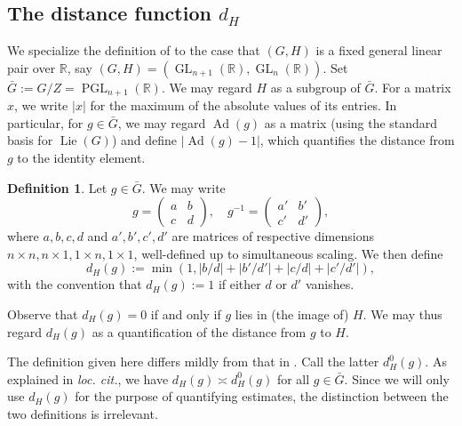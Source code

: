 \documentclass[reqno]{amsart}
\DeclareMathOperator{\GL}{GL}
\DeclareMathOperator{\Ad}{Ad}
\DeclareMathOperator{\PGL}{PGL}
\DeclareMathOperator{\Lie}{Lie}
\theoremstyle{plain} \newtheorem{theorem} {Theorem}
\theoremstyle{definition} \newtheorem{definition} [theorem] {Definition}
\theoremstyle{itplain} %
\numberwithin{equation}{section}
\numberwithin{theorem}{section}
\begin{document}
\subsection{The distance function $d_H$}\label{sec:dist-funct-d_h}
We specialize the definition of  \cite[\S4.2]{2020arXiv201202187N} to the case that $(G,H)$ is a fixed general linear pair over $\mathbb{R}$, say $(G,H) = (\GL_{n+1}(\mathbb{R}), \GL_n(\mathbb{R}))$.  Set $\bar{G} := G/Z = \PGL_{n+1}(\mathbb{R})$.  We may regard $H$ as a subgroup of $\bar{G}$.  For a matrix $x$, we write $|x|$ for the maximum of the absolute values of its entries.  In particular, for $g \in \bar{G}$, we may regard $\Ad(g)$ as a matrix (using the standard basis for $\Lie(G)$) and define $|\Ad(g) - 1|$, which quantifies the distance from $g$ to the identity element.

\begin{definition}
Let $g \in \bar{G}$.  We may write
\begin{equation*}
  g = \begin{pmatrix}
    a & b \\
    c & d
  \end{pmatrix},
  \quad
  g^{-1} =
  \begin{pmatrix}
    a' & b' \\
    c' & d'
  \end{pmatrix},
\end{equation*}
where $a,b,c,d$ and $a',b',c',d'$ are matrices of respective dimensions $n \times n, n \times 1, 1 \times n, 1 \times 1$, well-defined up to simultaneous scaling.  We then define 
\begin{equation*}
  d_H(g) := \min\left(1, |b/d| + |b'/d'| + |c/d| + |c'/d'|\right),
\end{equation*}
with the convention that $d_H(g) := 1$ if either $d$ or $d'$ vanishes.
\end{definition}

Observe that $d_H(g) = 0$ if and only if $g$ lies in (the image of) $H$.  We may thus regard $d_H(g)$ as a quantification of the distance from $g$ to $H$.

\begin{remark}
  The definition given here differs mildly from that in \cite[\S4.2]{2020arXiv201202187N}.  Call the latter $d_H^0(g)$.  As explained in \emph{loc. cit.}, we have $d_H(g) \asymp d_H^0(g)$ for all $g \in \bar{G}$.  Since we will only use $d_H(g)$ for the purpose of quantifying estimates, the distinction between the two definitions is irrelevant.
\end{remark}
\end{document}
